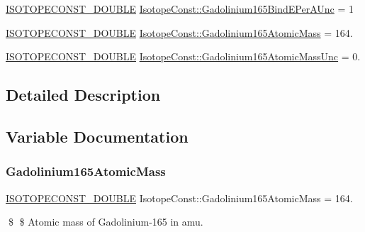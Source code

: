\begin{DoxyCompactItemize}
\mbox{\hyperlink{group___isotope_const-_macros_ga8f45a7272ce02c0b4c65c44636ed719a}{I\+S\+O\+T\+O\+P\+E\+C\+O\+N\+S\+T\+\_\+\+D\+O\+U\+B\+LE}} \mbox{\hyperlink{group___isotope_const-_gadolinium-_gd165_gaddf7b4d936616519bc71796e1cb4a0fd}{Isotope\+Const\+::\+Gadolinium165\+Bind\+E\+Per\+A\+Unc}} = 1
\item 
\mbox{\hyperlink{group___isotope_const-_macros_ga8f45a7272ce02c0b4c65c44636ed719a}{I\+S\+O\+T\+O\+P\+E\+C\+O\+N\+S\+T\+\_\+\+D\+O\+U\+B\+LE}} \mbox{\hyperlink{group___isotope_const-_gadolinium-_gd165_gab516454d85e5d3e3394fe56725f5c059}{Isotope\+Const\+::\+Gadolinium165\+Atomic\+Mass}} = 164.
\item 
\mbox{\hyperlink{group___isotope_const-_macros_ga8f45a7272ce02c0b4c65c44636ed719a}{I\+S\+O\+T\+O\+P\+E\+C\+O\+N\+S\+T\+\_\+\+D\+O\+U\+B\+LE}} \mbox{\hyperlink{group___isotope_const-_gadolinium-_gd165_ga792439de4bd6b686c1e6ec46defc71fd}{Isotope\+Const\+::\+Gadolinium165\+Atomic\+Mass\+Unc}} = 0.
\end{DoxyCompactItemize}


\subsection{Detailed Description}


\subsection{Variable Documentation}
\mbox{\label{group___isotope_const-_gadolinium-_gd165_gab516454d85e5d3e3394fe56725f5c059}} 
\subsubsection{\texorpdfstring{Gadolinium165\+Atomic\+Mass}{Gadolinium165AtomicMass}}
{\footnotesize\ttfamily \mbox{\hyperlink{group___isotope_const-_macros_ga8f45a7272ce02c0b4c65c44636ed719a}{I\+S\+O\+T\+O\+P\+E\+C\+O\+N\+S\+T\+\_\+\+D\+O\+U\+B\+LE}} Isotope\+Const\+::\+Gadolinium165\+Atomic\+Mass = 164.}

\$ \$ Atomic mass of Gadolinium-\/165 in amu. \mbox{\label{group___isotope_const-_gadolinium-_gd165_ga792439de4bd6b686c1e6ec46defc71fd}} 

